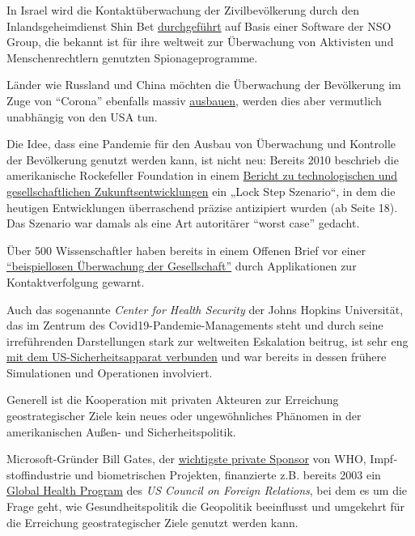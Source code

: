 In Israel wird die Kontaktüberwachung der Zivilbevölkerung durch den
Inlandsgeheimdienst Shin Bet
\href{https://www.techdirt.com/articles/20200402/14261944226/controversial-spyware-vendor-nso-group-is-helping-israeli-government-spy-own-citizens.shtml}{durchgeführt}
auf Basis einer Software der NSO Group, die bekannt ist für ihre
weltweit zur Überwachung von Aktivisten und Menschenrechtlern genutzten
Spionageprogramme.

Länder wie Russland und China möchten die Überwachung der Bevölkerung im
Zuge von ``Corona'' ebenfalls massiv
\href{https://www.npr.org/sections/coronavirus-live-updates/2020/04/01/825329399/moscow-launches-new-surveillance-app-to-track-residents-in-coronavirus-lockdown}{ausbauen},
werden dies aber vermutlich unabhängig von den USA tun.

Die Idee, dass eine Pandemie für den Ausbau von Überwachung und
Kontrolle der Bevölkerung genutzt werden kann, ist nicht neu: Bereits
2010 beschrieb die amerikanische Rockefeller Foundation in einem
\href{https://swprs.files.wordpress.com/2020/04/rockefeller-foundation-scenarios-2010.pdf}{Bericht
zu technologischen und gesellschaftlichen Zukunftsentwicklungen} ein
„Lock Step Szenario``, in dem die heutigen Entwicklungen überraschend
präzise antizipiert wurden (ab Seite 18). Das Szenario war damals als
eine Art autoritärer ``worst case'' gedacht.

Über 500 Wissenschaftler haben bereits in einem Offenen Brief vor einer
\href{https://www.esat.kuleuven.be/cosic/sites/contact-tracing-joint-statement/}{``beispiellosen
Überwachung der Gesellschaft''} durch Applikationen zur
Kontaktverfolgung gewarnt.

Auch das sogenannte \emph{Center for Health Security} der Johns Hopkins
Universität, das im Zentrum des Covid19-Pandemie-Managements steht und
durch seine irreführenden Darstellungen stark zur weltweiten Eskalation
beitrug, ist sehr eng
\href{http://unlimitedhangout.com/2020/04/investigative-series/all-roads-lead-to-dark-winter/}{mit
dem US-Sicherheitsapparat verbunden} und war bereits in dessen frühere
Simulationen und Operationen involviert.

Generell ist die Kooperation mit privaten Akteuren zur Erreichung
geostrategischer Ziele kein neues oder ungewöhnliches Phänomen in der
amerikanischen Außen- und Sicherheitspolitik.

Microsoft-Gründer Bill Gates, der
\href{https://www.youtube.com/watch?v=wQSYdAX_9JY}{wichtigste private
Sponsor} von WHO, Impf­stoff­industrie und biometrischen Projekten,
finanzierte z.B. bereits 2003 ein
\href{https://www.cfr.org/news-releases/council-establishes-senior-fellowship-global-health-and-foreign-policy-grant-bill}{Global
Health Program} des \emph{US Council on Foreign Relations}, bei dem es
um die Frage geht, wie Gesundheitspolitik die Geopolitik beeinflusst und
umgekehrt für die Erreichung geostrategischer Ziele genutzt werden kann.

